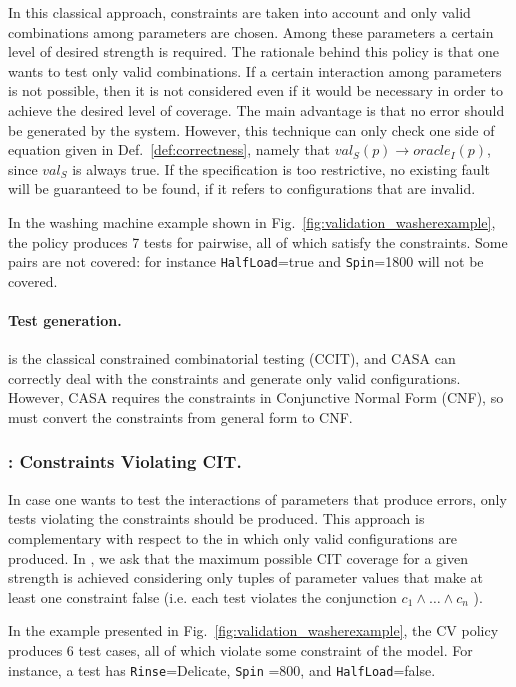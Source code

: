 \begin{tikzborder}{\cite{Gargantini16:validation}}
	In this classical approach, constraints are taken into account and only valid
	combinations among parameters are chosen. Among these parameters
	a certain level of desired strength is required. The rationale behind
	this policy is that one wants to test only valid combinations. If
	a certain interaction among parameters is not possible, then it is
	not considered even if it would be necessary in order to achieve the
	desired level of coverage. The main advantage is that no error should
	be generated by the system. However, this technique can only check
	one side of equation given in Def.~\ref{def:correctness}, namely
	that $val_{S}(p)\rightarrow$$oracle_{I}(p)$, since $val_{S}$ is always
	true. If the specification is too restrictive, %
	no existing fault will be guaranteed to be found, if it refers to configurations that are 
	invalid. %
	\begin{example}
		In the washing machine example shown in Fig.~\ref{fig:validation_washerexample}, the \ccit policy produces 7 tests for pairwise, all of which satisfy the constraints. Some pairs are not covered: for instance \texttt{HalfLoad}=true and \texttt{Spin}=1800 will not be covered.
	\end{example}
	
	\paragraph*{Test generation.} \ccit is the classical constrained combinatorial testing (CCIT), and CASA can correctly deal with the constraints and generate only valid configurations. However, CASA requires the constraints in Conjunctive Normal Form (CNF), so \citlab must convert the constraints from general form to CNF.
	
	\subsubsection{\cv: Constraints Violating CIT.}
	In case one wants to test the interactions of parameters that produce errors, 
	only tests violating the constraints should be produced. This approach is complementary with respect to the \ccit in which only valid configurations are produced. In \cv, we ask that the maximum possible CIT coverage for a given strength is achieved considering only tuples of parameter values that make at least one constraint false (i.e. each test violates the conjunction $c_{1}\wedge \dots\wedge c_{n}$ ). 
	\begin{example}
		In the example presented in Fig.~\ref{fig:validation_washerexample}, the CV policy produces 6 test cases, all of which violate some constraint of the model. For instance, a test has \texttt{Rinse}=Delicate, \texttt{Spin} =800, and \texttt{HalfLoad}=false.
	\end{example}

\end{tikzborder}
